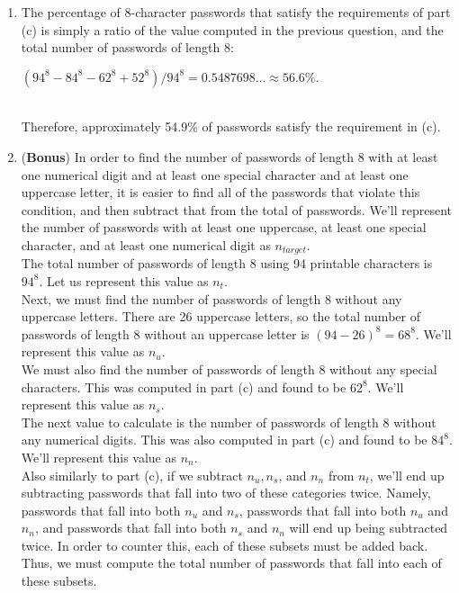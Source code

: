 \documentclass[11pt]{article}
\theoremstyle{definition}
\begin{document}
\begin{enumerate}
\begin{enumerate}
\item The percentage of 8-character passwords that satisfy the requirements of part (c) is simply a ratio of the value computed in the previous question, and the total number of passwords
of length 8:\\
\centerline{$(94^8 - 84^8 - 62^8 + 52^8)/94^8 = 0.5487698\ldots \approx 56.6\%.$}\\

Therefore, approximately 54.9\% of passwords satisfy the requirement in (c).\\

\item (\textbf{Bonus}) In order to find the number of passwords of length 8 with at least one numerical digit and at least one special character and at least one uppercase letter, it is easier to find
all of the passwords that violate this condition, and then subtract that from the total of passwords. We'll represent the number of passwords with at least one uppercase, at least one special character, and
at least one numerical digit as $n_{target}$.\\

The total number of passwords of length 8 using 94 printable characters is $94^8$. Let us represent this value as $n_{t}$.\\

Next, we must find the number of passwords of length 8 without any uppercase letters. There are 26 uppercase letters, so the total number of passwords of length 8 without an uppercase letter is $(94 - 26)^8 = 68^8$.
We'll represent this value as $n_{u}$.\\

We must also find the number of passwords of length 8 without any special characters. This was computed in part (c) and found to be $62^8$. We'll represent this value as $n_{s}$.\\

The next value to calculate is the number of passwords of length 8 without any numerical digits. This was also computed in part (c) and found to be $84^8$. We'll represent this value as $n_{n}$.\\

Also similarly to part (c), if we subtract $n_{u}, n_{s}$, and $n_{n}$ from $n_{t}$, we'll end up subtracting passwords that fall into two of these categories twice. Namely,
passwords that fall into both $n_{u}$ and $n_{s}$, passwords that fall into both $n_{u}$ and $n_{n}$, and passwords that fall into both $n_{s}$ and $n_{n}$ will end up
being subtracted twice. In order to counter this, each of these subsets must be added back. Thus, we must compute the total number of passwords that fall into each of these subsets.\\


\end{enumerate}
\end{enumerate}
\end{document}
